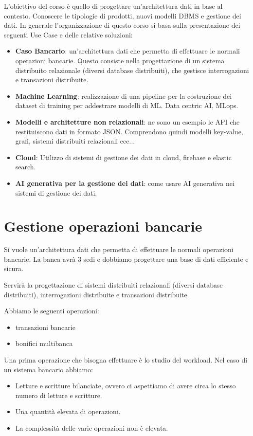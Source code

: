 L'obiettivo del corso è quello di progettare un'architettura dati in base al
contesto. Conoscere le tipologie di prodotti, nuovi modelli DBMS e gestione dei
dati. In generale l'organizzazione di questo corso si basa sulla presentazione dei
seguenti Use Case e delle relative soluzioni:
\begin{itemize}
    \item \textbf{Caso Bancario}: un'architettura dati che permetta di effettuare
          le normali operazioni bancarie. Questo consiste nella progettazione di
          un sistema distribuito relazionale (diversi database distribuiti), che
          gestisce interrogazioni e transazioni distribuite.
    \item \textbf{Machine Learning}: realizzazione di una pipeline per la
          costruzione dei dataset di training per addestrare modelli di ML.
          Data centric AI, MLops.
    \item \textbf{Modelli e architetture non relazionali}: ne sono un esempio
          le API che restituiscono dati in formato JSON. Comprendono quindi
          modelli key-value, grafi, sistemi distribuiti relazionali ecc...
    \item \textbf{Cloud}: Utilizzo di sistemi di gestione dei dati in cloud,
          firebase e elastic search.
    \item \textbf{AI generativa per la gestione dei dati}: come usare AI
          generativa nei sistemi di gestione dei dati.
\end{itemize}
\section{Gestione operazioni bancarie}
Si vuole un'architettura dati che permetta di effettuare le normali operazioni
bancarie. La banca avrà $3$ sedi e dobbiamo progettare una base di dati efficiente
e sicura.

Servirà la progettazione di sistemi distribuiti relazionali (diversi
database distribuiti), interrogazioni distribuite e transazioni distribuite.

Abbiamo le seguenti operazioni:
\begin{itemize}
    \item transazioni bancarie
    \item bonifici multibanca
\end{itemize}
Una prima operazione che bisogna effettuare è lo studio del workload. Nel caso di
un sistema bancario abbiamo:
\begin{itemize}
    \item Letture e scritture bilanciate, ovvero ci aspettiamo di avere circa lo
          stesso numero di letture e scritture.
    \item Una quantità elevata di operazioni.
    \item La complessità delle varie operazioni non è elevata.
\end{itemize}

